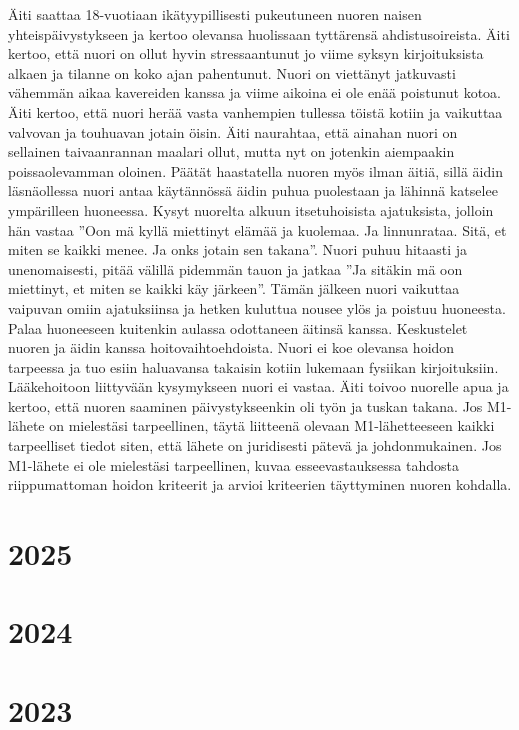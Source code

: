 \documentclass[
]{book}
\begin{document}
Äiti saattaa 18-vuotiaan ikätyypillisesti pukeutuneen nuoren naisen yhteispäivystykseen ja kertoo olevansa huolissaan tyttärensä ahdistusoireista. Äiti kertoo, että nuori on ollut hyvin stressaantunut jo viime syksyn kirjoituksista alkaen ja tilanne on koko ajan pahentunut. Nuori on viettänyt jatkuvasti vähemmän aikaa kavereiden kanssa ja viime aikoina ei ole enää poistunut kotoa. Äiti kertoo, että nuori herää vasta vanhempien tullessa töistä kotiin ja vaikuttaa valvovan ja touhuavan jotain öisin. Äiti naurahtaa, että ainahan nuori on sellainen taivaanrannan maalari ollut, mutta nyt on jotenkin aiempaakin poissaolevamman oloinen.
Päätät haastatella nuoren myös ilman äitiä, sillä äidin läsnäollessa nuori antaa käytännössä äidin puhua puolestaan ja lähinnä katselee ympärilleen huoneessa. Kysyt nuorelta alkuun itsetuhoisista ajatuksista, jolloin hän vastaa ''Oon mä kyllä miettinyt elämää ja kuolemaa. Ja linnunrataa. Sitä, et miten se kaikki menee. Ja onks jotain sen takana''. Nuori puhuu hitaasti ja unenomaisesti, pitää välillä pidemmän tauon ja jatkaa ''Ja sitäkin mä oon miettinyt, et miten se kaikki käy järkeen''. Tämän jälkeen nuori vaikuttaa vaipuvan omiin ajatuksiinsa ja hetken kuluttua nousee ylös ja poistuu huoneesta. Palaa huoneeseen kuitenkin aulassa odottaneen äitinsä kanssa.
Keskustelet nuoren ja äidin kanssa hoitovaihtoehdoista. Nuori ei koe olevansa hoidon tarpeessa ja tuo esiin haluavansa takaisin kotiin lukemaan fysiikan kirjoituksiin. Lääkehoitoon liittyvään kysymykseen nuori ei vastaa. Äiti toivoo nuorelle apua ja kertoo, että nuoren saaminen päivystykseenkin oli työn ja tuskan takana.
Jos M1-lähete on mielestäsi tarpeellinen, täytä liitteenä olevaan M1-lähetteeseen kaikki tarpeelliset tiedot siten, että lähete on juridisesti pätevä ja johdonmukainen. Jos M1-lähete ei ole mielestäsi tarpeellinen, kuvaa esseevastauksessa tahdosta riippumattoman hoidon kriteerit ja arvioi kriteerien täyttyminen nuoren kohdalla.

\chapter{2025}\label{section-1}

\chapter{2024}\label{section-2}

\chapter{2023}\label{section-3}
\end{document}
